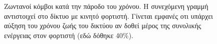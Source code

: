\begin{figure}[H]
  \centering
  \caption{Ζωντανοί κόμβοι κατά την πάροδο του χρόνου. Η συνεχόμενη γραμμή αντιστοιχεί στο δίκτυο με κινητό φορτιστή. Γίνεται εμφανές οτι υπάρχει αύξηση
	του χρόνου ζωής του δικτύου αν δοθεί μέρος της συνολικής ενέργειας
   στον φορτιστή (εδώ δόθηκε 40\%).}
  \label{fig:1exp_1_1}
\end{figure}

